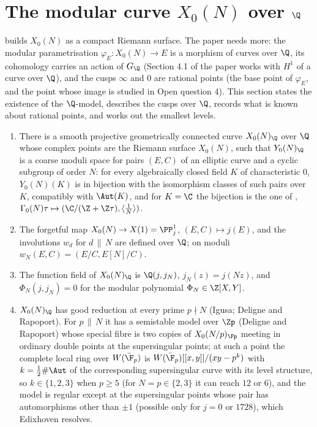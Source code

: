 \section{The modular curve \texorpdfstring{$X_0(N)$}{X0(N)} over \texorpdfstring{$\Q$}{Q}}\label{sec:moddeg:x0q}

 builds $X_0(N)$ as a compact Riemann surface. The paper needs more: the modular parametrisation $\varphi_E\colon X_0(N)\to E$ is
a morphism of curves over $\Q$, its cohomology carries an action of $G_\Q$ (Section 4.1 of the paper works with $H^1$ of a curve over $\Q$), and the cusps
$\infty$ and $0$ are rational points (the base point of $\varphi_E$, and the point whose image is studied in Open question 4). This section states the
existence of the $\Q$-model, describes the cusps over $\Q$, records what is known about rational points, and works out the smallest levels.

\begin{theorem}\label{thm:moddeg:x0-over-q}
\leavevmode
\begin{enumerate}[label=(\roman*)]
\item There is a smooth projective geometrically connected curve $X_0(N)_\Q$ over $\Q$ whose complex points are the Riemann surface $X_0(N)$, such
that $Y_0(N)_\Q$ is a coarse moduli space for pairs $(E,C)$ of an elliptic curve and a cyclic subgroup of order $N$: for every algebraically closed
field $K$ of characteristic $0$, $Y_0(N)(K)$ is in bijection with the isomorphism classes of such pairs over $K$, compatibly with $\Aut(K)$, and for
$K=\C$ the bijection is the one of , $\Gamma_0(N)\tau\mapsto(\C/(\Z+\Z\tau),\langle\frac1N\rangle)$.
\item The forgetful map $X_0(N)\to X(1)=\PP^1_j$, $(E,C)\mapsto j(E)$, and the involutions $w_d$ for $d\,\|\,N$ are defined over $\Q$; on moduli
$w_N(E,C)=(E/C,E[N]/C)$.
\item The function field of $X_0(N)_\Q$ is $\Q(j,j_N)$, $j_N(z)=j(Nz)$, and $\Phi_N(j,j_N)=0$ for the modular polynomial $\Phi_N\in\Z[X,Y]$.
\item $X_0(N)_\Q$ has good reduction at every prime $p\nmid N$ (Igusa; Deligne and Rapoport). For $p\,\|\,N$ it has a semistable model over $\Zp$
(Deligne and Rapoport) whose special fibre is two copies of $X_0(N/p)_{\Fp}$ meeting in ordinary double points at the supersingular points; at such a point the
complete local ring over $W(\bar\F_p)$ is $W(\bar\F_p)[[x,y]]/(xy-p^k)$ with $k=\frac12\#\Aut$ of the corresponding supersingular curve with its level structure,
so $k\in\{1,2,3\}$ when $p\ge5$ (for $N=p\in\{2,3\}$ it can reach $12$ or $6$), and the model is regular except at the supersingular points whose pair has automorphisms other than $\pm1$ (possible only for $j=0$ or $1728$),
which Edixhoven resolves.
\end{enumerate}
\end{theorem}

